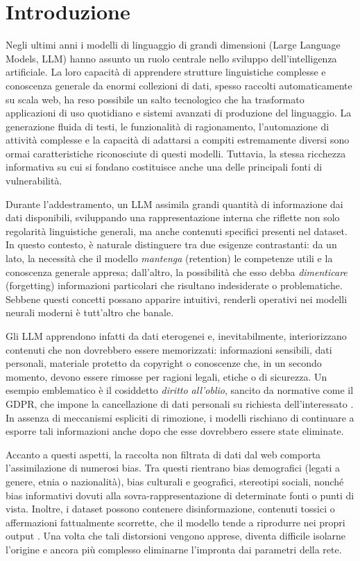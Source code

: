 \chapter{Introduzione}

Negli ultimi anni i modelli di linguaggio di grandi dimensioni (Large Language Models, LLM) hanno assunto un ruolo centrale nello sviluppo dell’intelligenza artificiale. La loro capacità di apprendere strutture linguistiche complesse e conoscenza generale da enormi collezioni di dati, spesso raccolti automaticamente su scala web, ha reso possibile un salto tecnologico che ha trasformato applicazioni di uso quotidiano e sistemi avanzati di produzione del linguaggio. La generazione fluida di testi, le funzionalità di ragionamento, l’automazione di attività complesse e la capacità di adattarsi a compiti estremamente diversi sono ormai caratteristiche riconosciute di questi modelli. Tuttavia, la stessa ricchezza informativa su cui si fondano costituisce anche una delle principali fonti di vulnerabilità.

Durante l’addestramento, un LLM assimila grandi quantità di informazione dai dati disponibili, sviluppando una rappresentazione interna che riflette non solo regolarità linguistiche generali, ma anche contenuti specifici presenti nel dataset. In questo contesto, è naturale distinguere tra due esigenze contrastanti: da un lato, la necessità che il modello \emph{mantenga} (retention) le competenze utili e la conoscenza generale appresa; dall’altro, la possibilità che esso debba \emph{dimenticare} (forgetting) informazioni particolari che risultano indesiderate o problematiche. Sebbene questi concetti possano apparire intuitivi, renderli operativi nei modelli neurali moderni è tutt’altro che banale.

Gli LLM apprendono infatti da dati eterogenei e, inevitabilmente, interiorizzano contenuti che non dovrebbero essere memorizzati: informazioni sensibili, dati personali, materiale protetto da copyright o conoscenze che, in un secondo momento, devono essere rimosse per ragioni legali, etiche o di sicurezza. Un esempio emblematico è il cosiddetto \emph{diritto all’oblio}, sancito da normative come il GDPR, che impone la cancellazione di dati personali su richiesta dell’interessato \cite{feretzakis2025gdpr}. In assenza di meccanismi espliciti di rimozione, i modelli rischiano di continuare a esporre tali informazioni anche dopo che esse dovrebbero essere state eliminate.

Accanto a questi aspetti, la raccolta non filtrata di dati dal web comporta l’assimilazione di numerosi bias. Tra questi rientrano bias demografici (legati a genere, etnia o nazionalità), bias culturali e geografici, stereotipi sociali, nonché bias informativi dovuti alla sovra-rappresentazione di determinate fonti o punti di vista. Inoltre, i dataset possono contenere disinformazione, contenuti tossici o affermazioni fattualmente scorrette, che il modello tende a riprodurre nei propri output \cite{mehrabi2021survey}. Una volta che tali distorsioni vengono apprese, diventa difficile isolarne l’origine e ancora più complesso eliminarne l’impronta dai parametri della rete.

